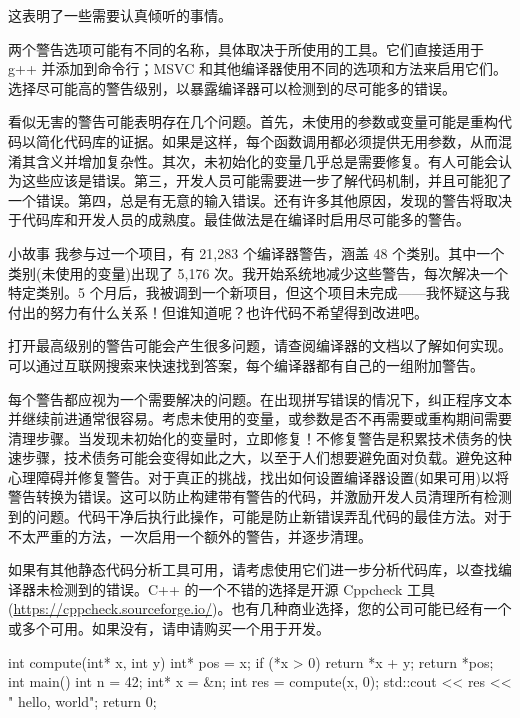 这表明了一些需要认真倾听的事情。

两个警告选项可能有不同的名称，具体取决于所使用的工具。它们直接适用于 g++ 并添加到命令行；MSVC 和其他编译器使用不同的选项和方法来启用它们。选择尽可能高的警告级别，以暴露编译器可以检测到的尽可能多的错误。


看似无害的警告可能表明存在几个问题。首先，未使用的参数或变量可能是重构代码以简化代码库的证据。如果是这样，每个函数调用都必须提供无用参数，从而混淆其含义并增加复杂性。其次，未初始化的变量几乎总是需要修复。有人可能会认为这些应该是错误。第三，开发人员可能需要进一步了解代码机制，并且可能犯了一个错误。第四，总是有无意的输入错误。还有许多其他原因，发现的警告将取决于代码库和开发人员的成熟度。最佳做法是在编译时启用尽可能多的警告。

\begin{myTip}{小故事}
我参与过一个项目，有 21,283 个编译器警告，涵盖 48 个类别。其中一个类别(未使用的变量)出现了 5,176 次。我开始系统地减少这些警告，每次解决一个特定类别。5 个月后，我被调到一个新项目，但这个项目未完成——我怀疑这与我付出的努力有什么关系！但谁知道呢？也许代码不希望得到改进吧。
\end{myTip}


打开最高级别的警告可能会产生很多问题，请查阅编译器的文档以了解如何实现。可以通过互联网搜索来快速找到答案，每个编译器都有自己的一组附加警告。

每个警告都应视为一个需要解决的问题。在出现拼写错误的情况下，纠正程序文本并继续前进通常很容易。考虑未使用的变量，或参数是否不再需要或重构期间需要清理步骤。当发现未初始化的变量时，立即修复！不修复警告是积累技术债务的快速步骤，技术债务可能会变得如此之大，以至于人们想要避免面对负载。避免这种心理障碍并修复警告。对于真正的挑战，找出如何设置编译器设置(如果可用)以将警告转换为错误。这可以防止构建带有警告的代码，并激励开发人员清理所有检测到的问题。代码干净后执行此操作，可能是防止新错误弄乱代码的最佳方法。对于不太严重的方法，一次启用一个额外的警告，并逐步清理。

如果有其他静态代码分析工具可用，请考虑使用它们进一步分析代码库，以查找编译器未检测到的错误。C++ 的一个不错的选择是开源 Cppcheck 工具 (\url{https://cppcheck.sourceforge.io/})。也有几种商业选择，您的公司可能已经有一个或多个可用。如果没有，请申请购买一个用于开发。


\begin{cpp}
int compute(int* x, int y) {
  int* pos = x;
  if (*x > 0)
    return *x + y;
  return *pos;
}
int main() {
  int n = 42;
  int* x = &n;
  int res = compute(x, 0);
  std::cout << res << " hello, world\n";
  return 0;
}
\end{cpp}

